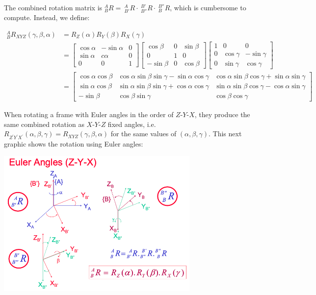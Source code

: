 The combined rotation matrix is $^{A}_{B}R =\ ^{A}_{B'}R \cdot \ ^{B'}_{B''}R \cdot \ ^{B''}_{B}R$, which is cumbersome to compute. Instead, we define:

\begin{align*}
{ }_{B}^{A} R_{X Y Z}(\gamma, \beta, \alpha) &=R_{Z}(\alpha) R_{Y}(\beta) R_{X}(\gamma) \\
&=\left[\begin{array}{ccc}
\cos \alpha & -\sin \alpha & 0 \\ \sin \alpha & c \alpha & 0 \\ 0 & 0 & 1
\end{array}\right]\left[\begin{array}{ccc}
\cos \beta & 0 & \sin \beta \\ 0 & 1 & 0 \\ -\sin \beta & 0 & \cos \beta
\end{array}\right]\left[\begin{array}{ccc} 1 & 0 & 0 \\ 0 & \cos \gamma & -\sin \gamma \\
0 & \sin \gamma & \cos \gamma
\end{array}\right] \\
&= \left[\begin{array}{ccc}
\cos \alpha \cos \beta & \cos \alpha \sin \beta \sin \gamma-\sin \alpha \cos \gamma & \cos \alpha \sin \beta \cos \gamma+\sin \alpha \sin \gamma \\
\sin \alpha \cos \beta & \sin \alpha \sin \beta \sin \gamma+\cos \alpha \cos \gamma & \sin \alpha \sin \beta \cos \gamma-\cos \alpha \sin \gamma \\
-\sin \beta & \cos \beta \sin \gamma & \cos \beta \cos \gamma
\end{array}\right]
\end{align*}

When rotating a frame with Euler angles in the order of $Z$-$Y$-$X$, they produce the same combined rotation as $X$-$Y$-$Z$ fixed angles, i.e. $R_{Z^{\prime} Y^{\prime} X^{\prime}}(\alpha, \beta, \gamma)=R_{X Y Z}(\gamma, \beta, \alpha)$ for the same values of $(\alpha, \beta, \gamma)$. This next graphic shows the rotation using Euler angles:

\begin{center}
	\includegraphics[width=10cm]{sections/imgs/2_euler_angles.png}
\end{center}

